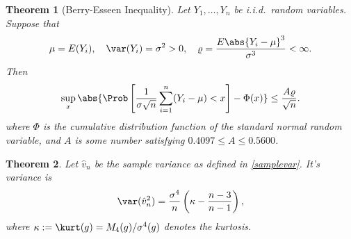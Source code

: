 \documentclass[12pt]{amsart}
\newcommand{\hv}{\hat{v}}
\newtheorem{theorem}{Theorem}
\begin{document}
\begin{theorem}[Berry-Esseen Inequality] \label{BE} Let $Y_1,\dots,Y_n$ be i.i.d.\ random variables.  Suppose that
\[
\mu=E(Y_i), \quad \var(Y_i)=\sigma^2>0, \quad \varrho=\frac{E\abs{Y_i - \mu}^3}{\sigma^3} < \infty.
\]
Then
\[
\sup_x\abs{\Prob\left[\frac{1}{\sigma\sqrt{n}}\sum_{i=1}^{n}(Y_i-\mu)<x \right]-\Phi(x)}\leq \frac{A \varrho}{\sqrt{n}}.
\]
where $\Phi$ is the cumulative distribution function of the standard normal random variable, and $A$ is some number satisfying $0.4097\leq A\leq 0.5600$.
\end{theorem}

\begin{theorem} \label{Varvarthm} Let $\hv_n$ be the sample variance as defined in \eqref{samplevar}.  It's variance is
\[
\var(\hv_n^2) = \frac{\sigma^4}{n} \left ( \kappa  - \frac{n-3}{n-1} \right),
\]
where $\kappa:= \kurt(g) = M_4(g)/\sigma^4(g)$ denotes the \emph{kurtosis}.
\end{theorem}
\end{document}

